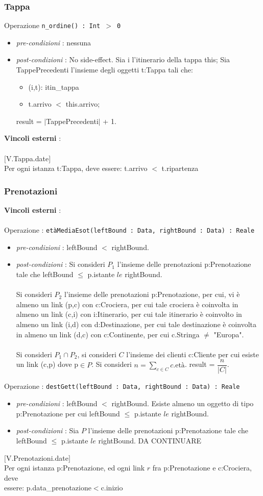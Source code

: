 \documentclass[12pt, letterpaper]{article}
\newcommand{\acc}{\\\hphantom{}\\}
\newcommand{\code}[1]{\colorbox{light-gray}{\texttt{#1}}}
\begin{document}
\subsubsection{Tappa}
Operazione \code{n\_ordine() : Int $>$ 0}\begin{itemize}
    \item \textit{pre-condizioni} : nessuna 
    \item \textit{post-condizioni} : No side-effect.
    Sia i l'itinerario della tappa this;
    Sia TappePrecedenti l'insieme degli oggetti t:Tappa tali che:\begin{itemize}
        \item  (i,t): itin\_tappa\\
        \item  t.arrivo $<$ this.arrivo;\end{itemize}
    result = $|$TappePrecedenti$|$ + 1. 
\end{itemize}
\textbf{Vincoli esterni} :\acc
$[$V.Tappa.date$]$\\
\hphantom{ident}Per ogni istanza t:Tappa, deve essere:
		t.arrivo $<$ t.ripartenza
\subsubsection{Prenotazioni}
\textbf{Vincoli esterni} :\acc
Operazione : \code{etàMediaEsot(leftBound : Data, rightBound : Data) : Reale}\begin{itemize}
    \item \textit{pre-condizioni} : leftBound $<$ rightBound. 
    \item \textit{post-condizioni} : Si consideri $P_1$ l'insieme delle prenotazioni p:Prenotazione tale 
    che leftBound $\le$ p.istante $le$ rightBound.\acc 
    Si consideri $P_2$ l'insieme delle prenotazioni p:Prenotazione, per cui, vi è almeno un link (p,c) con c:Crociera, per cui 
    tale crociera è coinvolta in almeno un link (c,i) con i:Itinerario, per cui tale itinerario è coinvolto in almeno un 
    link (i,d) con d:Destinazione, per cui tale destinazione è coinvolta in almeno un link (d,c) con c:Continente, per cui 
    c.Stringa $\ne$ "Europa".\acc 
    Si consideri $P_1\cap P_2$, si consideri $C$ l'insieme dei clienti c:Cliente per cui esiste un link (c,p) dove 
    p$\in P$. Si consideri $n=\displaystyle \sum_{c\in C}c.\text{età}$.
    result = $\dfrac{n}{|C|}$.
\end{itemize} 
Operazione : \code{destGett(leftBound : Data, rightBound : Data) : Reale}\begin{itemize}
    \item \textit{pre-condizioni} : leftBound $<$ rightBound. Esiste almeno un oggetto di tipo p:Prenotazione 
    per cui leftBound $\le$ p.istante $le$ rightBound.
    \item \textit{post-condizioni} : Sia $P$ l'insieme delle prenotazioni p:Prenotazione tale 
    che leftBound $\le$ p.istante $le$ rightBound. \color{red}DA CONTINUARE\color{black}
\end{itemize} 
$[$V.Prenotazioni.date$]$\\
\hphantom{ident} Per ogni istanza p:Prenotazione, ed ogni link $r$ fra p:Prenotazione e c:Crociera, deve\\ 
\hphantom{ident} essere:
p.data\_prenotazione$<$c.inizio
\end{document}
